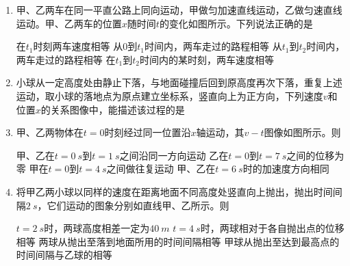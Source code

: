 \begin{enumerate}[leftmargin=0em]
\item 
{}
甲、乙两车在同一平直公路上同向运动，甲做匀加速直线运动，乙做匀速直线运动。甲、乙两车的位置$ x $随时间$ t $的变化如图所示。下列说法正确的是  
\begin{figure}[h!]
\centering

\end{figure}


\fourchoices
{在$ t_{1} $时刻两车速度相等}
{从$ 0 $到$ t_{1} $时间内，两车走过的路程相等}
{从$ t_{1} $到$ t_{2} $时间内，两车走过的路程相等}
{在$ t_{1} $到$ t_{2} $时间内的某时刻，两车速度相等}


\item 
{}
小球从一定高度处由静止下落，与地面碰撞后回到原高度再次下落，重复上述运动，取小球的落地点为原点建立坐标系，竖直向上为正方向，下列速度$ v $和位置$ x $的关系图像中，能描述该过程的是  
\begin{figure}[h!]
\centering

\end{figure}


\item 
{}
甲、乙两物体在$ t=0 $时刻经过同一位置沿$ x $轴运动，其$ v-t $图像如图所示。则  


\begin{minipage}[h!]{0.7\linewidth}
\vspace{0.3em}
\fourchoices
{甲、乙在$ t=0 \ s $到$ t=1 \ s $之间沿同一方向运动}
{乙在$ t=0 $到$ t=7 \ s $之间的位移为零}
{甲在$ t=0 $到$ t=4 \ s $之间做往复运动}
{甲、乙在$ t=6 \ s $时的加速度方向相同}

\vspace{0.3em}
\end{minipage}
\hfill
\begin{minipage}[h!]{0.3\linewidth}
\flushright
\vspace{0.3em}

\vspace{0.3em}
\end{minipage}


\item 
{}
将甲乙两小球以同样的速度在距离地面不同高度处竖直向上抛出，抛出时间间隔$ 2 \ s $，它们运动的图象分别如直线甲、乙所示。则  


\begin{minipage}[h!]{0.7\linewidth}
\vspace{0.3em}
\fourchoices
{$ t=2 \ s $时，两球高度相差一定为$ 40 \ m $}
{$ t=4 \ s $时，两球相对于各自抛出点的位移相等}
{两球从抛出至落到地面所用的时间间隔相等}
{甲球从抛出至达到最高点的时间间隔与乙球的相等}


\end{minipage}
\end{enumerate}
